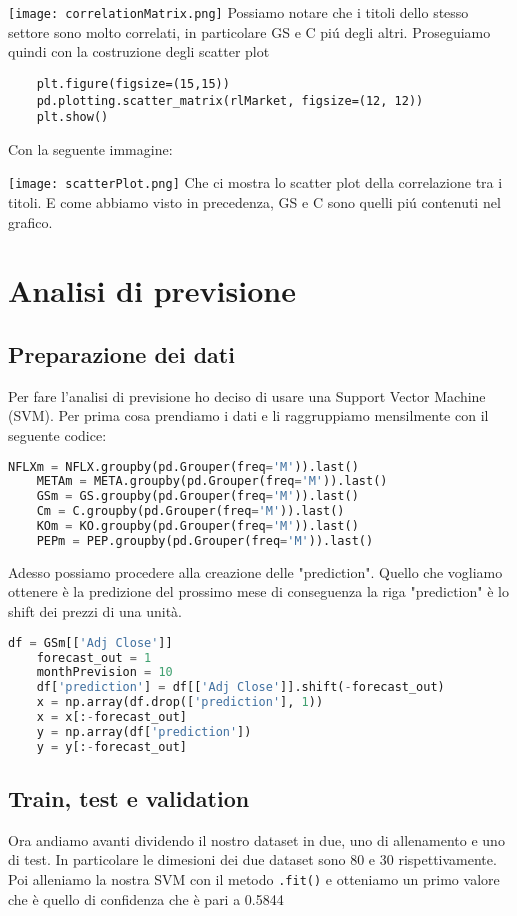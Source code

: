 \documentclass{report}
\begin{document}
\texttt{[image: correlationMatrix.png]}
Possiamo notare che i titoli dello stesso settore sono molto correlati, in particolare GS e C piú degli altri.
Proseguiamo quindi con la costruzione degli scatter plot
\begin{lstlisting}
    plt.figure(figsize=(15,15))
    pd.plotting.scatter_matrix(rlMarket, figsize=(12, 12))
    plt.show()
\end{lstlisting}
Con la seguente immagine:

\texttt{[image: scatterPlot.png]}
Che ci mostra lo scatter plot della correlazione tra i titoli. E come abbiamo visto in precedenza, GS e C sono quelli piú contenuti nel grafico.
\chapter{Analisi di previsione}
\section{Preparazione dei dati}
Per fare l'analisi di previsione ho deciso di usare una Support Vector Machine (SVM). Per prima cosa prendiamo i dati e li raggruppiamo mensilmente con il seguente codice:
\begin{lstlisting}[language=python]
    NFLXm = NFLX.groupby(pd.Grouper(freq='M')).last()
    METAm = META.groupby(pd.Grouper(freq='M')).last()
    GSm = GS.groupby(pd.Grouper(freq='M')).last()
    Cm = C.groupby(pd.Grouper(freq='M')).last()
    KOm = KO.groupby(pd.Grouper(freq='M')).last()
    PEPm = PEP.groupby(pd.Grouper(freq='M')).last()
\end{lstlisting}
Adesso possiamo procedere alla creazione delle "prediction". Quello che vogliamo ottenere è la predizione del prossimo mese di conseguenza la riga "prediction" è lo shift dei prezzi di una unità.

\begin{lstlisting}[language=python]
    df = GSm[['Adj Close']]
    forecast_out = 1
    monthPrevision = 10
    df['prediction'] = df[['Adj Close']].shift(-forecast_out)
    x = np.array(df.drop(['prediction'], 1))
    x = x[:-forecast_out]
    y = np.array(df['prediction'])
    y = y[:-forecast_out]
\end{lstlisting}
\section{Train, test e validation}
Ora andiamo avanti dividendo il nostro dataset in due, uno di allenamento e uno di test. In particolare le dimesioni dei due dataset sono 80 e 30 rispettivamente. Poi alleniamo la nostra SVM con il metodo \lstinline{.fit()} e otteniamo un primo valore che è quello di confidenza che è pari a \num{0.5844}
\end{document}
